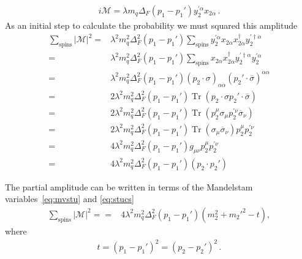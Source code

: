 \begin{align}
 i\mathcal{M}=\lambda  m_q\Delta_F(p_1-p_1')y^{\prime \alpha}_2 x_{2\alpha}\,.
\end{align}
As an initial step to calculate the probability we must squared this amplitude
\begin{align}
  \sum_{\text{spins}} |\mathcal{M}|^2=&\lambda^2   m_q^2\Delta_F^2(p_1-p_1')
     \sum_{\text{spins}} y^{\prime \alpha}_2 x_{2\alpha}x^{\dagger}_{2\dot{\alpha}} y^{\prime\dagger\dot{\alpha}}_2     \nonumber\\
=&\lambda^2   m_q^2\Delta_F^2(p_1-p_1')
     \sum_{\text{spins}}  x_{2\alpha}x^{\dagger}_{2\dot{\alpha}} y^{\prime\dagger\dot{\alpha}}_2 y^{\prime \alpha}_2     \nonumber\\
=&\lambda^2   m_q^2\Delta_F^2(p_1-p_1')
   \left( p_2\cdot \sigma \right)_{\alpha\dot{\alpha}} \left( p_2'\cdot \overline{\sigma} \right)^{\dot{\alpha}\alpha}      \nonumber\\
  =& 2 \lambda^2 m_q^2\Delta_F^2(p_1-p_1') \operatorname{Tr}\left( p_2\cdot \sigma p_2'\cdot \overline{\sigma} \right) \nonumber\\
  =& 2 \lambda^2 m_q^2\Delta_F^2(p_1-p_1') \operatorname{Tr}\left( p_2^{\mu} \sigma_{\mu} p_2^{\prime \nu} \overline{\sigma}_{\nu} \right) \nonumber\\
  =& 2 \lambda^2 m_q^2\Delta_F^2(p_1-p_1')\operatorname{Tr}\left(  \sigma_{\mu}  \overline{\sigma}_{\nu} \right) p_2^{\mu} p_2^{\prime \nu}\nonumber\\
  =& 4 \lambda^2 m_q^2\Delta_F^2(p_1-p_1') g_{\mu\nu} p_2^{\mu} p_2^{\prime \nu}\nonumber\\
  =& 4 \lambda^2 m_q^2\Delta_F^2(p_1-p_1') \left( p_2\cdot p_2' \right) 
\end{align}

The partial amplitude can be written in terms of the Mandelstam variables~\eqref{eq:mvstu} and \eqref{eq:stucs}
\begin{align}
  \sum_{\text{spins}} |\mathcal{M}|^2=
  =& 4 \lambda^2 m_q^2\Delta_F^2(p_1-p_1') 
     \left( m_2^2+{m_2'}^2-t \right),
\end{align}
where
\begin{align}
  t=\left( p_1-p_1' \right)^2=\left( p_2-p_2' \right)^2\,.
\end{align}

